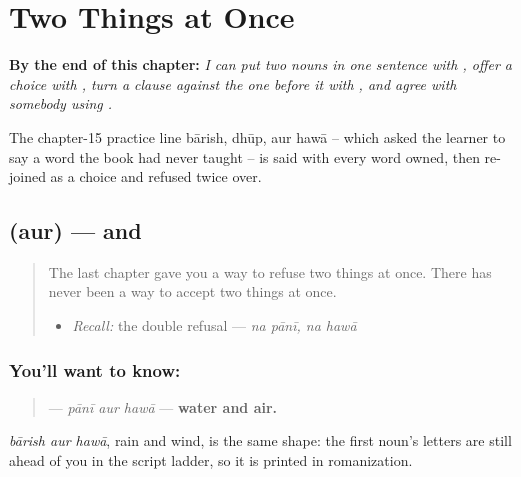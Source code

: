 
\chapter{Two Things at Once}
\label{ch:ur-two-things-at-once}

\begin{chapteropening}
\textbf{By the end of this chapter:} \emph{I can put two nouns in one sentence with , offer a choice with , turn a clause against the one before it with , and agree with somebody using  .}

The chapter-15 practice line bārish, dhūp, aur hawā -- which asked the learner to say a word the book had never taught -- is said with every word owned, then re-joined as a choice and refused twice over.
\end{chapteropening}

\section[\texorpdfstring{\ur{اور} (aur)}{اور (aur)}]{ (aur) — and}

\label{lesson:UR-C20-aur}



\begin{quote}
The last chapter gave you a way to refuse two things at once. There has never been a way to accept two things at once.

\begin{itemize}
\raggedright
  \item \emph{Recall:} the double refusal — \emph{na pānī, na hawā}
\end{itemize}
\end{quote}

\subsection*{You'll want to know: }
\begin{quote}
\textbf{  } — \emph{pānī aur hawā} — \textbf{water and air.}
\end{quote}

\emph{bārish aur hawā}, rain and wind, is the same shape: the first noun's letters are still ahead of you in the script ladder, so it is printed in romanization.

